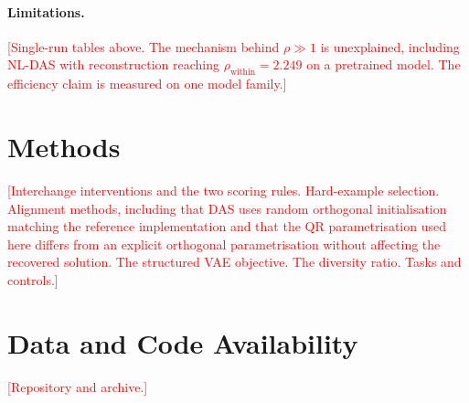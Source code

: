 \documentclass[11pt]{article}
\newcommand{\TODO}[1]{\textcolor{red}{[#1]}}
\begin{document}
\paragraph{Limitations.}
\TODO{Single-run tables above. The mechanism behind $\rho \gg 1$ is unexplained,
including NL-DAS with reconstruction reaching $\rho_\text{within} = 2.249$ on a
pretrained model. The efficiency claim is measured on one model family.}

\section{Methods}

\TODO{Interchange interventions and the two scoring rules. Hard-example
selection. Alignment methods, including that DAS uses random orthogonal
initialisation matching the reference implementation and that the QR
parametrisation used here differs from an explicit orthogonal parametrisation
without affecting the recovered solution. The structured VAE objective. The
diversity ratio. Tasks and controls.}

\section*{Data and Code Availability}
\TODO{Repository and archive.}



\end{document}
